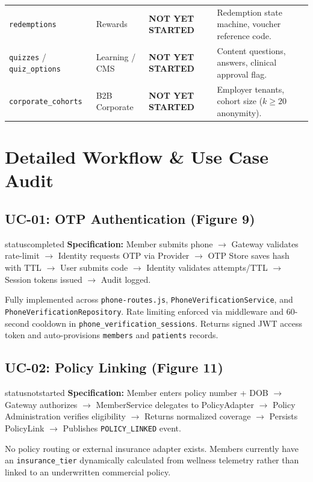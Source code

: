 \documentclass[11pt,a4paper]{article}
\begin{document}
\begin{longtable}{p{4.5cm} p{3.2cm} p{3.2cm} p{3.8cm}}
    \texttt{redemptions} & Rewards & \textcolor{statusnotstarted}{\textbf{NOT YET STARTED}} & Redemption state machine, voucher reference code. \\
    \texttt{quizzes} / \texttt{quiz\_options} & Learning / CMS & \textcolor{statusnotstarted}{\textbf{NOT YET STARTED}} & Content questions, answers, clinical approval flag. \\
    \texttt{corporate\_cohorts} & B2B Corporate & \textcolor{statusnotstarted}{\textbf{NOT YET STARTED}} & Employer tenants, cohort size ($k \ge 20$ anonymity). \\
    \bottomrule
\end{longtable}

\newpage

\section{Detailed Workflow \& Use Case Audit}

\subsection{UC-01: OTP Authentication (Figure 9)}
\begin{statusbox}{statuscompleted}
    \textbf{Specification:} Member submits phone $\to$ Gateway validates rate-limit $\to$ Identity requests OTP via Provider $\to$ OTP Store saves hash with TTL $\to$ User submits code $\to$ Identity validates attempts/TTL $\to$ Session tokens issued $\to$ Audit logged.
\end{statusbox}
Fully implemented across \texttt{phone-routes.js}, \texttt{PhoneVerificationService}, and \texttt{PhoneVerificationRepository}. Rate limiting enforced via middleware and 60-second cooldown in \texttt{phone\_verification\_sessions}. Returns signed JWT access token and auto-provisions \texttt{members} and \texttt{patients} records.

\subsection{UC-02: Policy Linking (Figure 11)}
\begin{statusbox}{statusnotstarted}
    \textbf{Specification:} Member enters policy number + DOB $\to$ Gateway authorizes $\to$ MemberService delegates to PolicyAdapter $\to$ Policy Administration verifies eligibility $\to$ Returns normalized coverage $\to$ Persists PolicyLink $\to$ Publishes \texttt{POLICY\_LINKED} event.
\end{statusbox}
No policy routing or external insurance adapter exists. Members currently have an \texttt{insurance\_tier} dynamically calculated from wellness telemetry rather than linked to an underwritten commercial policy.
\end{document}
